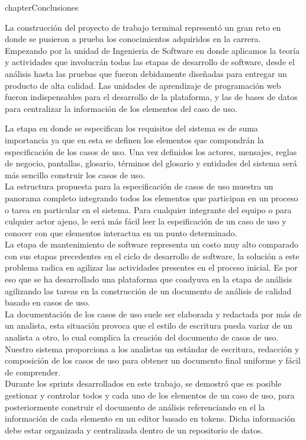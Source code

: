 
chapter{Conclusiones} \label{cap:diez}

La construcción del proyecto de trabajo terminal representó un gran reto en donde se pusieron a prueba los conocimientos adquiridos en la carrera. Empezando por la unidad de Ingenieria de Software en donde aplicamos la teoría y actividades que involucrán todas las etapas de desarrollo de software, desde el análisis hasta las pruebas que fueron debidamente diseñadas para entregar un producto de alta calidad. Las unidades de aprendizaje de programación web fueron indispensables para el desarrollo de la plataforma, y las de bases de datos para centralizar la información de los elementos del caso de uso.

La etapa en donde se especifican los requisitos del sistema es de suma importancia ya que en esta se definen los elementos que compondrán la especificación de los casos de uso. Una vez definidos los actores, mensajes, reglas de negocio, pantallas, glosario, términos del glosario y entidades del sistema será más sencillo construir los casos de uso.\\

La estructura propuesta para la especificación de casos de uso muestra un panorama completo integrando todos los elementos que participan en un proceso o tarea en particular en el sistema. Para cualquier integrante del equipo o para culquier actor ajeno, le será más fácil leer la espeificación de un caso de uso y conocer con que elementos interactua en un punto determinado.\\

La etapa de mantenimiento de software representa un costo muy alto comparado con sus etapas precedentes en el ciclo de desarrollo de software, la solución a este problema radica en agilizar las actividades presentes en el proceso inicial. Es por eso que se ha desarrollado una plataforma que coadyuva en la etapa de análisis agilizando las tareas en la construcción de un documento de análisis de calidad basado en casos de uso.\\

La documentación de los casos de uso suele ser elaborada y redactada por más de un analista, esta situación provoca que el estilo de escritura pueda variar de un analista a otro, lo cual complica la creación del documento de casos de uso. Nuestro sistema proporciona a los analistas un estándar de escritura, redacción y composición de los casos de uso para obtener un documento final uniforme y fácil de comprender.\\

Durante los sprints desarrollados en este trabajo, se demostró que es posible gestionar y controlar todos y cada uno de los elementos de un caso de uso, para posteriormente construir el documento de análisis referenciando en el la información de cada elemento en un editor basado en tokens. Dicha información debe estar organizada y centralizada dentro de un repositorio de datos.\\

